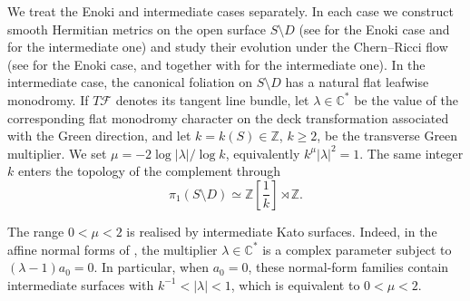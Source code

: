 \documentclass[12pt]{amsart}
\numberwithin{equation}{section}
\theoremstyle{remark}
\theoremstyle{definition}
\begin{document}
We treat the Enoki and intermediate cases separately. In each case we construct smooth Hermitian metrics on the open surface $S\setminus D$ (see  for the Enoki case and  for the intermediate one) and study their evolution under the Chern--Ricci flow (see  for the Enoki case, and  together with  for the intermediate one). In the intermediate case, the canonical foliation on $S\setminus D$ has a natural flat leafwise monodromy. If $T\mathcal F$ denotes its tangent line bundle, let $\lambda\in\mathbb C^*$ be the value of the corresponding flat monodromy character on the deck transformation associated with the Green direction, and let $k=k(S)\in\mathbb Z$, $k\geq2$, be the transverse Green multiplier. We set $\mu=-2\log|\lambda|/\log k$, equivalently $k^\mu|\lambda|^2=1$. The same integer $k$ enters the topology of the complement through \cite{dloussky-oeljeklaus-toma,oeljeklaus-toma-moduli}
$$\pi_1(S\setminus D)\simeq \mathbb Z\!\left[\frac1k\right]\rtimes\mathbb Z.$$

The range $0<\mu<2$ is realised by intermediate Kato surfaces. Indeed, in the affine normal forms of \cite[Section~3.1]{oeljeklaus-toma-moduli}, the multiplier $\lambda\in\mathbb C^*$ is a complex parameter subject to $(\lambda-1)a_0=0$. In particular, when $a_0=0$, these normal-form families contain intermediate surfaces with $k^{-1}<|\lambda|<1$, which is equivalent to $0<\mu<2$.
\end{document}
